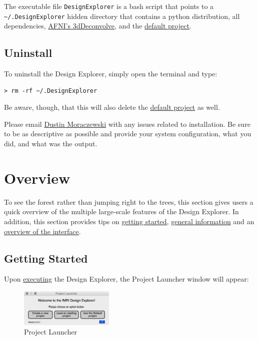 \documentclass[10pt]{article}
\begin{document}
	The executable file \texttt{DesignExplorer} is a bash script that points to a \texttt{\textasciitilde/.DesignExplorer} hidden directory that contains a python distribution, all dependencies, \href{https://afni.nimh.nih.gov/pub/dist/doc/program_help/3dDeconvolve.html}{AFNI's 3dDeconvolve}, and the \hyperref[subsec:default]{default project}.

	\subsection{Uninstall}
	\label{ininstall}
		To uninstall the Design Explorer, simply open the terminal and type:
\begin{lstlisting}
> rm -rf ~/.DesignExplorer
\end{lstlisting}
		Be aware, though, that this will also delete the \hyperref[subsec:default]{default project} as well.

	\vfill
	Please email \href{mailto:dmoracze@umd.edu}{Dustin Moraczewski} with any issues related to installation.
	Be sure to be as descriptive as possible and provide your system configuration, what you did, and what was the output.
\newpage

\section{Overview}
\label{sec:overview}
	To see the forest rather than jumping right to the trees, this section gives users a quick overview of the multiple large-scale features of the Design Explorer.
	In addition, this section provides tips on \hyperref[subsec:start]{getting started}, \hyperref[subsec:general]{general information} and an \hyperref[subsec:overview]{overview of the interface}.

	\subsection{Getting Started}
	\label{subsec:start}
		Upon \hyperref[subsec:run]{executing} the Design Explorer, the Project Launcher window will appear:
		\vspace{3mm}
		\begin{figure}[ht]
		\centering
		\includegraphics[width=0.4\textwidth,frame]{fig/1_launcher.jpg}
		\caption{Project Launcher}
		\label{fig:launch}
		\end{figure}
\end{document}
